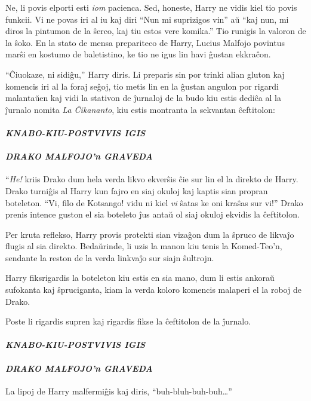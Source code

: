 Ne, li povis elporti esti \emph{iom} pacienca. Sed, honeste, Harry ne
vidis kiel tio povis funkcii. Vi ne povas iri al iu kaj diri ``Nun mi
suprizigos vin'' aŭ ``kaj nun, mi diros la pintumon de
la ŝerco, kaj tiu estos vere komika.'' Tio runigis la valoron de la
ŝoko. En la stato de mensa prepariteco de Harry, Lucius Malfojo
povintus marŝi en kostumo de baletistino, ke tio ne igus lin havi
ĝustan ekkraĉon.

``Ĉiuokaze, ni sidiĝu,'' Harry diris. Li preparis sin por trinki alian
gluton kaj komencis iri al la foraj seĝoj, tio metis lin en la ĝustan
angulon por rigardi malantaŭen kaj vidi la stativon de ĵurnaloj de la
budo kiu estis dediĉa al la ĵurnalo nomita \emph{La Ĉikananto}, kiu
estis montranta la sekvantan ĉeftitolon:

\paragraph{\emph{KNABO-KIU-POSTVIVIS IGIS}}

\paragraph{\emph{DRAKO MALFOJO'n GRAVEDA}} ``\emph{He!} kriis Drako dum
hela verda likvo ekverŝis ĉie sur lin el la direkto de Harry. Drako
turniĝis al Harry kun fajro en siaj okuloj kaj kaptis sian propran
boteleton. ``Vi, filo de Kotsango! vidu ni kiel \emph{vi} ŝatas ke oni
kraŝas sur vi!'' Drako prenis intence guston el sia boteleto ĵus antaŭ
ol siaj okuloj ekvidis la ĉeftitolon.

Per kruta reflekso, Harry provis protekti sian vizaĝon dum la ŝpruco
de likvaĵo flugis al sia direkto. Bedaŭrinde, li uzis la manon kiu
tenis la Komed-Teo'n, sendante la reston de la verda linkvaĵo sur
siajn ŝultrojn.

Harry fiksrigardis la boteleton kiu estis en sia mano, dum li estis
ankoraŭ sufokanta kaj ŝpruciganta, kiam la verda koloro komencis
malaperi el la roboj de Drako.

Poste li rigardis supren kaj rigardis fikse la ĉeftitolon de la ĵurnalo.

\paragraph{\emph{KNABO-KIU-POSTVIVIS IGIS}}

\paragraph{\emph{DRAKO MALFOJO'n GRAVEDA}} La lipoj de Harry malfermiĝis
kaj diris, ``buh-bluh-buh-buh\ldots''

